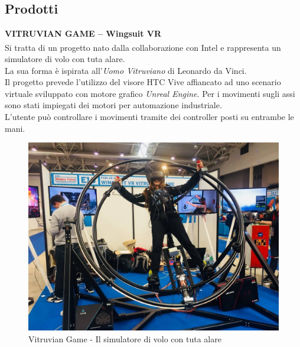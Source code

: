 \subsection{Prodotti}
\textbf{VITRUVIAN GAME – Wingsuit VR}
\\
Si tratta di un progetto nato dalla collaborazione con Intel\textsuperscript{\textregistered} e rappresenta un simulatore di volo con tuta alare.\\
La sua forma è ispirata all'\textit{Uomo Vitruviano} di Leonardo da Vinci.\\
Il progetto prevede l'utilizzo del visore HTC Vive affiancato ad uno scenario virtuale sviluppato con motore grafico \textit{Unreal Engine}. Per i movimenti sugli assi sono stati impiegati dei motori per automazione industriale.\\
L'utente può controllare i movimenti tramite dei controller posti su entrambe le mani.
\\
\begin{figure}[H]
	\begin{center}
	\includegraphics[scale=0.15]{immagini/vitruvian.jpg}
	\caption{Vitruvian Game - Il simulatore di volo con tuta alare}
	\end{center}
\end{figure}

